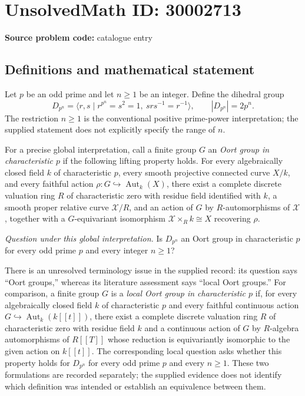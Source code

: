 \documentclass[11pt]{article}
\begin{document}
\section*{UnsolvedMath ID: 30002713}
\textbf{Source problem code:} catalogue entry
\subsection{Definitions and mathematical statement}
Let \(p\) be an odd prime and let \(n\geq 1\) be an integer. Define the dihedral group
\[
D_{p^n}=\langle r,s\mid r^{p^n}=s^2=1,\ srs^{-1}=r^{-1}\rangle,
\qquad |D_{p^n}|=2p^n.
\]
The restriction \(n\geq 1\) is the conventional positive prime-power interpretation; the supplied statement does not explicitly specify the range of \(n\).

For a precise global interpretation, call a finite group \(G\) an \emph{Oort group in characteristic \(p\)} if the following lifting property holds. For every algebraically closed field \(k\) of characteristic \(p\), every smooth projective connected curve \(X/k\), and every faithful action \(\rho:G\hookrightarrow\operatorname{Aut}_k(X)\), there exist a complete discrete valuation ring \(R\) of characteristic zero with residue field identified with \(k\), a smooth proper relative curve \(\mathcal X/R\), and an action of \(G\) by \(R\)-automorphisms of \(\mathcal X\), together with a \(G\)-equivariant isomorphism \(\mathcal X\times_R k\cong X\) recovering \(\rho\).

\emph{Question under this global interpretation.} Is \(D_{p^n}\) an Oort group in characteristic \(p\) for every odd prime \(p\) and every integer \(n\geq 1\)?

There is an unresolved terminology issue in the supplied record: its question says ``Oort groups,'' whereas its literature assessment says ``local Oort groups.'' For comparison, a finite group \(G\) is a \emph{local Oort group in characteristic \(p\)} if, for every algebraically closed field \(k\) of characteristic \(p\) and every faithful continuous action \(G\hookrightarrow\operatorname{Aut}_k(k[[t]])\), there exist a complete discrete valuation ring \(R\) of characteristic zero with residue field \(k\) and a continuous action of \(G\) by \(R\)-algebra automorphisms of \(R[[T]]\) whose reduction is equivariantly isomorphic to the given action on \(k[[t]]\). The corresponding local question asks whether this property holds for \(D_{p^n}\) for every odd prime \(p\) and every \(n\geq 1\). These two formulations are recorded separately; the supplied evidence does not identify which definition was intended or establish an equivalence between them.
\end{document}
